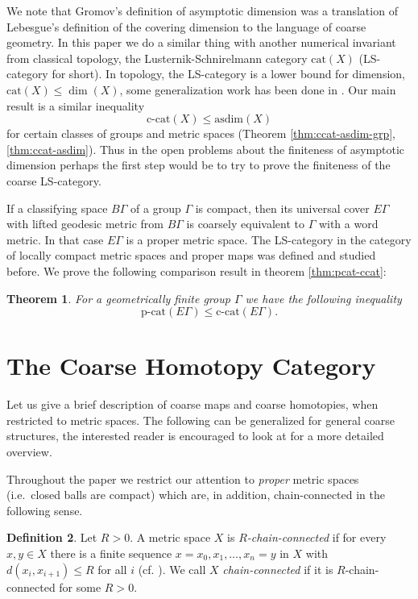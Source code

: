 \documentclass {amsart}
\newcommand {\ccat}     {\text{c-cat}}
\newcommand {\pcat}     {\text{p-cat}}
\newcommand {\cat}     {\text{cat}}
\newcommand {\asdim}    {\text{asdim}}
\newtheorem   {theorem}               {Theorem}       [section]
\theoremstyle {definition}
\newtheorem   {definition}  [theorem] {Definition}
\begin{document}
We note that Gromov's definition of asymptotic dimension was a translation
of Lebesgue's definition of the covering dimension to the language of coarse
geometry. In this paper we do a similar thing with another numerical invariant
from classical topology, the Lusternik-Schnirelmann category $ \cat(X) $
(LS-category for short). In topology, the LS-category is a lower bound for
dimension, $ \cat(X)\le\dim(X) $, some generalization work has been done in 
\cite{margolisCoarseHomologicalInvariants2024,
srinivasanLusternikSchirelmannCategoryPeano2015}. Our main result is a similar 
inequality
$$
    \ccat(X)\le \asdim(X)
$$
for certain classes of groups and metric spaces
(Theorem \ref{thm:ccat-asdim-grp}, \ref{thm:ccat-asdim}). Thus in the open problems 
about the finiteness of asymptotic dimension perhaps the first step would be to 
try to prove the finiteness of the coarse LS-category.

If a classifying space $ B\Gamma $ of a group $ \Gamma $ is compact, then its
universal cover $ E\Gamma $ with lifted geodesic metric from $ B\Gamma $ is
coarsely equivalent to $ \Gamma $ with a word metric. In that case $ E\Gamma $
is a proper metric space. The LS-category in the category of locally compact
metric spaces and proper maps was defined and studied
\cite{ayalaLusternikSchnirelmannInvariantsProper1992} 
before. We prove the following comparison result in theorem \ref{thm:pcat-ccat}:
\begin{theorem}
    For a geometrically finite group \( \Gamma \) we have the following inequality
    \[
        \pcat(E\Gamma) \leq \ccat(E\Gamma).
    \]
\end{theorem}

\section {The Coarse Homotopy Category}

Let us give a brief description of coarse maps and coarse homotopies, when
restricted to metric spaces. The following can be generalized for general coarse
structures, the interested reader is encouraged to look at
\cite{roeLecturesCoarseGeometry2003, mitchenerCoarseHomotopyGroups2020} for a
more detailed overview.

Throughout the paper we restrict our attention to \emph{proper} metric spaces
(i.e.\ closed balls are compact) which are, in addition, chain-connected in the
following sense.

\begin{definition} \label{def:chain-connected}
    Let \( R > 0 \). A metric space \( X \) is \emph{\( R \)-chain-connected} if
    for every \( x, y \in X \) there is a finite sequence \( x = x_0, x_1, \ldots,
    x_n = y \) in \( X \) with \( d(x_i, x_{i+1}) \leq R \) for all \( i \) (cf.
    \cite[Chapter I.8]{bridsonHaefligerMetricSpacesNonpositive1999}). We call \( X
    \) \emph{chain-connected} if it is \( R \)-chain-connected for some \( R > 0
    \).
\end{definition}
\end{document}
